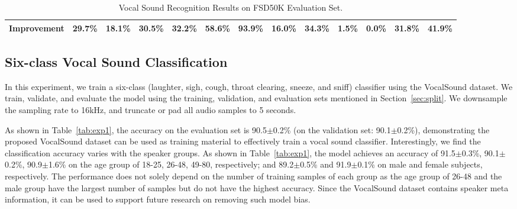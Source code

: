 \documentclass{article}
\newcommand{\squeezeup}{\vspace{-1.6mm}}
\begin{document}
\begin{table*}[t]
\begin{tabular}{@{}ccccccccccccc@{}}
Improvement                                                 & 29.7\%                                                 & \multicolumn{1}{c|}{18.1\%}                                                 & 30.5\%                                                 & \multicolumn{1}{c|}{32.2\%}                                                 & 58.6\%                                                 & \multicolumn{1}{c|}{93.9\%}                                                 & 16.0\%                                                 & \multicolumn{1}{c|}{34.3\%}                                                 & 1.5\%                                                  & \multicolumn{1}{c|}{0.0\%}                                                  & 31.8\%                                                 & 41.9\%                                                 \\ \bottomrule
\end{tabular}
\caption{Vocal Sound Recognition Results on FSD50K Evaluation Set.}
\label{tab:exp2}
\squeezeup
\end{table*}


\subsection{Six-class Vocal Sound Classification}
\label{sec:exp1}

In this experiment, we train a six-class (laughter, sigh, cough, throat clearing, sneeze, and sniff) classifier using the VocalSound dataset. We train, validate, and evaluate the model using the training, validation, and evaluation sets mentioned in Section~\ref{sec:split}. We downsample the sampling rate to 16kHz, and truncate or pad all audio samples to 5 seconds. 

As shown in Table~\ref{tab:exp1}, the accuracy on the evaluation set is 90.5$\pm$0.2\% (on the validation set: 90.1$\pm$0.2\%), demonstrating the proposed VocalSound dataset can be used as training material to effectively train a vocal sound classifier. Interestingly, we find the classification accuracy varies with the speaker groups. As shown in Table~\ref{tab:exp1}, the model achieves an accuracy of 91.5$\pm$0.3\%, 90.1$\pm$0.2\%, 90.9$\pm$1.6\% on the age group of 18-25, 26-48, 49-80, respectively; and 89.2$\pm$0.5\% and 91.9$\pm$0.1\% on male and female subjects, respectively. The performance does not solely depend on the number of training samples of each group as the age group of 26-48 and the male group have the largest number of samples but do not have the highest accuracy. Since the VocalSound dataset contains speaker meta information, it can be used to support future research on removing such model bias.
\end{document}
